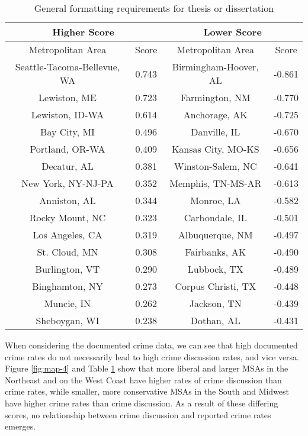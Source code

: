 \documentclass[12pt,oneside, letterpaper]{book}
\begin{document}
\begin{table}[h!]
    \centering
    \caption{General formatting requirements for thesis or dissertation}
    \begin{tabular}{| c | c | c | c |}
    \hline
    \multicolumn{2}{|c|}{Higher Score} & \multicolumn{2}{|c|}{Lower Score} \\ \hline
    Metropolitan Area & Score & Metropolitan Area & Score \\ \hline
    Seattle-Tacoma-Bellevue, WA & 0.743 & Birmingham-Hoover, AL & -0.861 \\ \hline
    Lewiston, ME & 0.723 & Farmington, NM & -0.770 \\ \hline
    Lewiston, ID-WA & 0.614 & Anchorage, AK & -0.725 \\ \hline
    Bay City, MI & 0.496 & Danville, IL & -0.670 \\ \hline
    Portland, OR-WA & 0.409 & Kansas City, MO-KS & -0.656 \\ \hline
    Decatur, AL & 0.381 & Winston-Salem, NC & -0.641 \\ \hline
    New York, NY-NJ-PA & 0.352 & Memphis, TN-MS-AR & -0.613 \\ \hline
    Anniston, AL & 0.344 & Monroe, LA & -0.582 \\ \hline
    Rocky Mount, NC & 0.323 & Carbondale, IL & -0.501 \\ \hline
    Los Angeles, CA & 0.319 & Albuquerque, NM & -0.497 \\ \hline
    St. Cloud, MN & 0.308 & Fairbanks, AK & -0.490 \\ \hline
    Burlington, VT & 0.290 & Lubbock, TX & -0.489 \\ \hline
    Binghamton, NY & 0.273 & Corpus Christi, TX & -0.448 \\ \hline
    Muncie, IN & 0.262 & Jackson, TN & -0.439 \\ \hline
    Sheboygan, WI & 0.238 & Dothan, AL & -0.431 \\ \hline
	\end{tabular}
	\label{table:table-5}
\end{table}

\par When considering the documented crime data, we can see that high documented crime rates do not necessarily lead to high crime discussion rates, and vice versa. Figure \ref{fig:map-4} and Table \ref{table:table-5} show that more liberal and larger MSAs in the Northeast and on the West Coast have higher rates of crime discussion than crime rates, while smaller, more conservative MSAs in the South and Midwest have higher crime rates than crime discussion. As a result of these differing scores, no relationship between crime discussion and reported crime rates emerges.
\end{document}

